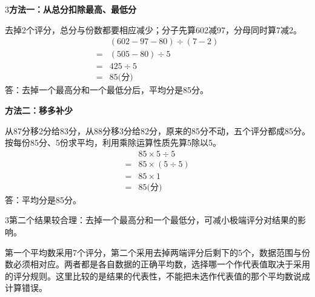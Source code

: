 \documentclass[multi=snippet,border={5bp 20bp 5bp 5bp}]{standalone}
\newenvironment{snippet}[3]{\begin{minipage}{#1bp}\color{answerred}\fontsize{#2}{#3}\selectfont\raggedright}{\end{minipage}}
\begin{document}
\begin{snippet}{505}{11.5}{14}\begin{multicols}{3}\raggedcolumns \textbf{方法一：从总分扣除最高、最低分}\par 去掉2个评分，总分与份数都要相应减少；分子先算602减97，分母同时算7减2。\[\begin{aligned}&(602-97-80)\div(7-2)\\={}&(505-80)\div5\\={}&425\div5\\={}&85\text{(分)}\end{aligned}\]答：去掉一个最高分和一个最低分后，平均分是85分。\par\textbf{方法二：移多补少}\par 从87分移2分给83分，从88分移3分给82分，原来的85分不动，五个评分都成85分。按每份85分、5份求平均，利用乘除运算性质先算5除以5。\[\begin{aligned}&85\times5\div5\\={}&85\times(5\div5)\\={}&85\times1\\={}&85\text{(分)}\end{aligned}\]答：平均分是85分。\end{multicols}\end{snippet}
\begin{snippet}{505}{11.5}{14}\begin{multicols}{3}\raggedcolumns 第二个结果较合理：去掉一个最高分和一个最低分，可减小极端评分对结果的影响。\par 第一个平均数采用7个评分，第二个采用去掉两端评分后剩下的5个，数据范围与份数必须相对应。两者都是各自数据的正确平均数，选择哪一个作代表值取决于采用的评分规则。这里比较的是结果的代表性，不能把未选作代表值的那个平均数说成计算错误。\end{multicols}\end{snippet}
\end{document}
